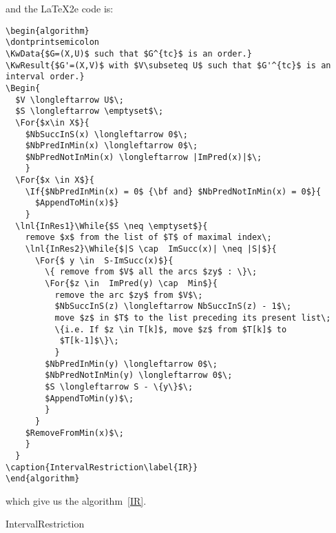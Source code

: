 \documentclass[a4paper]{article}
\begin{document}
\noindent and the \LaTeX2e code is:
\begin{samepage}
\begin{verbatim}
\begin{algorithm}
\dontprintsemicolon
\KwData{$G=(X,U)$ such that $G^{tc}$ is an order.}
\KwResult{$G'=(X,V)$ with $V\subseteq U$ such that $G'^{tc}$ is an
interval order.}
\Begin{
  $V \longleftarrow U$\;
  $S \longleftarrow \emptyset$\; 
  \For{$x\in X$}{ 
    $NbSuccInS(x) \longleftarrow 0$\;
    $NbPredInMin(x) \longleftarrow 0$\;
    $NbPredNotInMin(x) \longleftarrow |ImPred(x)|$\;
    }
  \For{$x \in X$}{
    \If{$NbPredInMin(x) = 0$ {\bf and} $NbPredNotInMin(x) = 0$}{
      $AppendToMin(x)$}
    } 
  \lnl{InRes1}\While{$S \neq \emptyset$}{
    remove $x$ from the list of $T$ of maximal index\;
    \lnl{InRes2}\While{$|S \cap  ImSucc(x)| \neq |S|$}{ 
      \For{$ y \in  S-ImSucc(x)$}{
        \{ remove from $V$ all the arcs $zy$ : \}\;
        \For{$z \in  ImPred(y) \cap  Min$}{
          remove the arc $zy$ from $V$\;
          $NbSuccInS(z) \longleftarrow NbSuccInS(z) - 1$\;
          move $z$ in $T$ to the list preceding its present list\;
          \{i.e. If $z \in T[k]$, move $z$ from $T[k]$ to 
           $T[k-1]$\}\;
          }
        $NbPredInMin(y) \longleftarrow 0$\;
        $NbPredNotInMin(y) \longleftarrow 0$\;
        $S \longleftarrow S - \{y\}$\;
        $AppendToMin(y)$\;
        }
      }
    $RemoveFromMin(x)$\;
    }
  }  
\caption{IntervalRestriction\label{IR}}
\end{algorithm}
\end{verbatim}
\end{samepage}

\noindent which give us the algorithm~\vref{IR}.

\begin{algorithm}
\dontprintsemicolon
\SetVline
{}
\caption{IntervalRestriction\label{IR}}
\end{algorithm}
\end{document}
